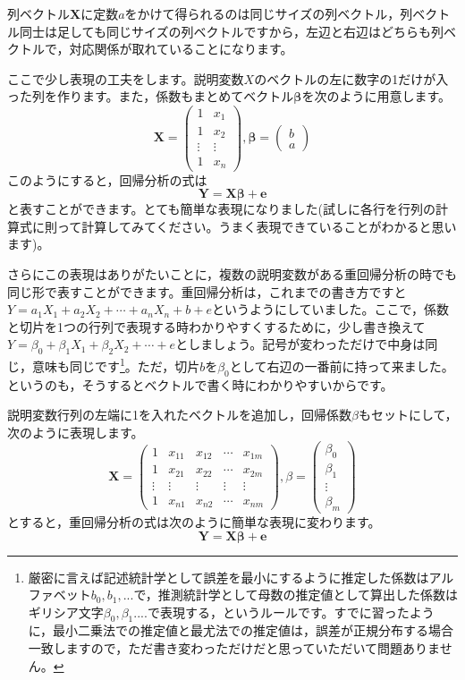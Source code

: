 \documentclass{ltjsbook}
\begin{document}
列ベクトル$\bm{X}$に定数$a$をかけて得られるのは同じサイズの列ベクトル，列ベクトル同士は足しても同じサイズの列ベクトルですから，左辺と右辺はどちらも列ベクトルで，対応関係が取れていることになります。

ここで少し表現の工夫をします。説明変数$X$のベクトルの左に数字の1だけが入った列を作ります。また，係数もまとめてベクトル$\bm{\beta}$を次のように用意します。
\[
	\bm{X} =
	\begin{pmatrix}
		1      & x_1    \\
		1      & x_2    \\
		\vdots & \vdots \\
		1      & x_n
	\end{pmatrix},
	\bm{\beta}=
	\begin{pmatrix}
		b \\
		a
	\end{pmatrix}
\]
このようにすると，回帰分析の式は
\[ \bm{Y} = \bm{X\beta} + \bm{e} \]
と表すことができます。とても簡単な表現になりました(試しに各行を行列の計算式に則って計算してみてください。うまく表現できていることがわかると思います)。

さらにこの表現はありがたいことに，複数の説明変数がある重回帰分析の時でも同じ形で表すことができます。重回帰分析は，これまでの書き方ですと$Y = a_1 X_1 + a_2 X_2 + \cdots + a_n X_n + b + e$というようにしていました。ここで，係数と切片を1つの行列で表現する時わかりやすくするために，少し書き換えて$Y = \beta_0 + \beta_1 X_1 + \beta_2 X_2 +\cdots +e $としましょう。記号が変わっただけで中身は同じ，意味も同じです\footnote{厳密に言えば記述統計学として誤差を最小にするように推定した係数はアルファベット$b_0,b_1,...$で，推測統計学として母数の推定値として算出した係数はギリシア文字$\beta_0,\beta_1....$で表現する，というルールです。すでに習ったように，最小二乗法での推定値と最尤法での推定値は，誤差が正規分布する場合一致しますので，ただ書き変わっただけだと思っていただいて問題ありません。}。ただ，切片$b$を$\beta_0$として右辺の一番前に持って来ました。というのも，そうするとベクトルで書く時にわかりやすいからです。

説明変数行列の左端に1を入れたベクトルを追加し，回帰係数$\beta$もセットにして，次のように表現します。
\[
	\bm{X} = \begin{pmatrix}
		1      & x_{11} & x_{12} & \cdots & x_{1m} \\
		1      & x_{21} & x_{22} & \cdots & x_{2m} \\
		\vdots & \vdots & \vdots & \vdots & \vdots \\
		1      & x_{n1} & x_{n2} & \cdots & x_{nm}
	\end{pmatrix},
	\beta=\begin{pmatrix}
		\beta_0 \\
		\beta_1 \\
		\vdots  \\
		\beta_m
	\end{pmatrix}
\]
とすると，重回帰分析の式は次のように簡単な表現に変わります。
\[ \bm{Y} = \bm{X \beta} + \bm{e} \]
\end{document}
